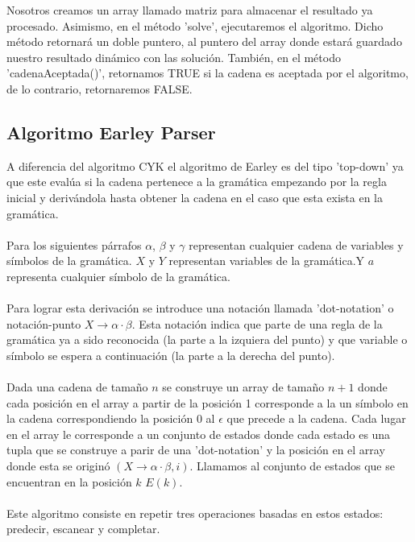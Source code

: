 \documentclass[12pt]{article}
\begin{document}
Nosotros creamos un array llamado matriz para almacenar el resultado ya procesado. Asimismo, en el método 'solve', ejecutaremos el algoritmo. Dicho método retornará un doble puntero, al puntero del array donde estará guardado nuestro resultado dinámico con las solución. También, en el método 'cadenaAceptada()', retornamos TRUE si la cadena es aceptada por el algoritmo, de lo contrario, retornaremos FALSE.


%

\newpage


\subsection{Algoritmo Earley Parser}
A diferencia del algoritmo CYK el algoritmo de Earley es del tipo 'top-down' ya que este evalúa si la cadena pertenece a la gramática empezando por la regla inicial y derivándola hasta obtener la cadena en el caso que esta exista en la gramática.
\\\\
Para los siguientes párrafos $\alpha$, $\beta$ y $\gamma$ representan cualquier cadena de variables y símbolos de la gramática. $X$ y $Y$ representan variables de la gramática.Y $a$ representa cualquier símbolo de la gramática.
\\\\
Para lograr esta derivación se introduce una notación llamada 'dot-notation' o notación-punto $X \rightarrow \alpha \cdot \beta$. Esta notación indica que parte de una regla de la gramática ya a sido reconocida (la parte a la izquiera del punto) y que variable o símbolo se espera a continuación (la parte a la derecha del punto).
\\\\
Dada una cadena de tamaño $n$ se construye un array de tamaño $n+1$ donde cada posición en el array a partir de la posición 1 corresponde a la un símbolo en la cadena correspondiendo la posición 0 al $\epsilon$ que precede a la cadena. Cada lugar en el array le corresponde a un conjunto de estados donde cada estado es una tupla que se construye a parir de una 'dot-notation' y la posición en el array donde esta se originó $(X \rightarrow \alpha \cdot \beta, i)$. Llamamos al conjunto de estados que se encuentran en la posición $k$ $E(k)$.
\\\\

Este algoritmo consiste en repetir tres operaciones basadas en estos estados: predecir, escanear y  completar.
\end{document}
